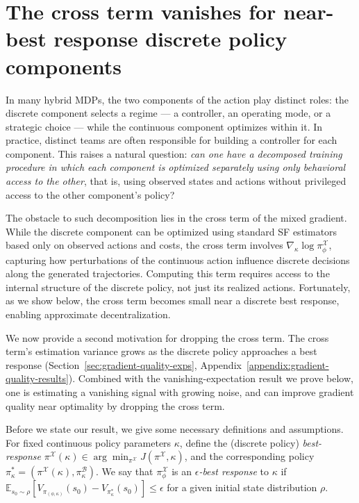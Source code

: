 \documentclass{article}
\theoremstyle{definition}
\theoremstyle{remark}
\begin{document}
\section{The cross term vanishes for near-best response discrete policy components}
\label{sec:cross-term-vanishes}

In many hybrid MDPs, the two components of the action play distinct roles: the discrete component selects a regime — a controller, an operating mode, or a strategic choice — while the continuous component optimizes within it. In practice, distinct teams are often responsible for building a controller for each component. This raises a natural question: \emph{can one have a
decomposed training procedure in which each component is optimized separately using only behavioral access to the other}, that is, using observed states and actions without privileged access to the other component’s policy?

The obstacle to such decomposition lies in the cross term of the mixed gradient. While the discrete component can be optimized using standard SF estimators based only on observed actions and costs, the cross term involves $\nabla_\kappa \log \pi^{\mathcal X}_\phi$, capturing how perturbations of the continuous action influence discrete decisions along the generated trajectories. Computing this term requires access to the internal structure of the discrete policy, not just its realized actions. 
Fortunately, as we show below, the 
cross term becomes small near a discrete best response, enabling approximate decentralization.

We now provide a second motivation for dropping the cross term. 
The cross term's estimation variance grows as the discrete policy approaches a best response (Section~\ref{sec:gradient-quality-exps}, Appendix~\ref{appendix:gradient-quality-results}). Combined with the vanishing-expectation result we prove below, one is estimating a vanishing signal with growing noise, and can improve gradient quality near optimality by dropping the cross term.

Before we state our result, we give some necessary definitions and assumptions.
For fixed continuous policy parameters $\kappa$, define the (discrete policy) \textit{best-response} $\pi^{\mathcal{X}}(\kappa) \in \arg\min_{\pi^{\mathcal{X}}} J(\pi^{\mathcal{X}}, \kappa)$, and the corresponding policy $\pi^*_\kappa = (\pi^{\mathcal{X}}(\kappa), \pi^{\mathcal{B}}_\kappa)$. We say that $\pi^{\mathcal{X}}_\phi$ is an \emph{$\epsilon$-best response} to $\kappa$ if $\mathbb{E}_{s_0 \sim \rho}[V_{\pi_{(\phi, \kappa)}}(s_0) - V_{\pi^*_\kappa}(s_0)] \leq \epsilon$ for a given initial state distribution $\rho$.
\end{document}

